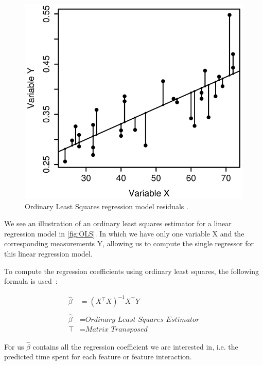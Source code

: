 \begin{figure}[H]
    \centering
    \includegraphics[scale=0.3]{gfx/OLS.png}
    \caption[Ordinary Least Squares regression model residuals]
    {Ordinary Least Squares regression model residuals
    \footnotemark .}
    \label{fig:OLS}
\end{figure}

We see an illustration of an ordinary least squares estimator for a linear regression model in \autoref{fig:OLS}. In which we have only one variable 
X and the corresponding measurements Y, allowing us to compute the single regressor for this linear regression model.

To compute the regression coefficients using ordinary least squares, the following formula is used~\cite{Linear-Regression}:

\begin{align}
    \hat{\beta} &=  (\textit{X}^{\top } \textit{X} )^{-1}\textit{X}^{\top} Y \\ \nonumber \\\nonumber
    \hat{\beta} &= \textit{Ordinary Least Squares Estimator}\\\nonumber
    \top &= \textit{Matrix Transposed}\nonumber
\end{align}\label{equ:ols}

For us $\hat{\beta}$ contains all the regression coefficient we are interested in, i.e. the predicted time spent for each feature or feature interaction.

